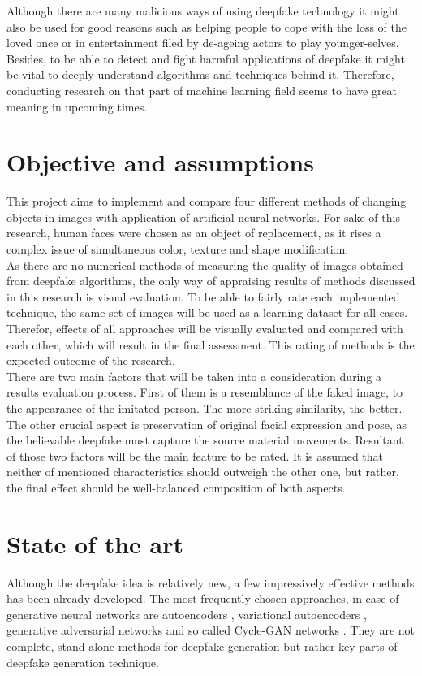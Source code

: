 Although there are many malicious ways of using deepfake technology it might also be used for good reasons such as helping people to cope with the loss of the loved once or in entertainment filed by de-ageing actors to play younger-selves. Besides, to be able to detect and fight harmful applications of deepfake it might be vital to deeply understand algorithms  and techniques behind it. Therefore, conducting research on that part of machine learning field seems to have great meaning in upcoming times.

\section{Objective and assumptions}
This project aims to implement and compare four different methods of changing objects in images with application of artificial neural networks. For sake of this research, human faces were chosen as an object of replacement, as it rises a complex issue of simultaneous color, texture and shape modification.\\

As there are no numerical methods of measuring the quality of images obtained from deepfake algorithms, the only way of appraising results of methods discussed in this research is visual evaluation. To be able to fairly rate each implemented technique, the same set of images will be used as a learning dataset for all cases. Therefor, effects of all approaches will be visually evaluated and compared with each other, which will result in the final assessment. This rating of methods is the expected outcome of the research.\\

There are two main factors that will be taken into a consideration during a results evaluation process. First of them is a resemblance of the faked image, to the appearance of the imitated person. The more striking similarity, the better. The other crucial aspect is preservation of original facial expression and pose, as the believable deepfake must capture the source material movements. Resultant of those two factors will be the main feature to be rated. It is assumed that neither of mentioned characteristics should outweigh the other one, but rather, the final effect should be well-balanced composition of both aspects.

\section{State of the art}
Although the deepfake idea is relatively new, a few impressively effective methods has been already developed. The most frequently chosen approaches, in case of generative neural networks are autoencoders \cite{autoencoders_bib}, variational autoencoders \cite{variational_bayes_bib} \cite{vae_loss_bib}, generative adversarial networks \cite{autoencoding_beyond_pixels_bib} \cite{U_GAT_IT_bib} and so called Cycle-GAN networks \cite{cycleGAN_1_bib} \cite{cycleGAN_2_bib} \cite{cycleGAN_3_bib}. They are not complete, stand-alone methods for deepfake generation but rather key-parts of deepfake generation technique.\\

